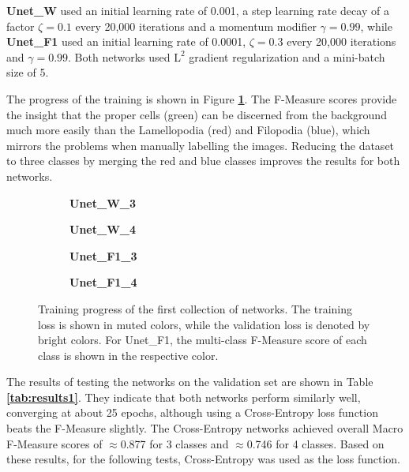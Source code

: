 \textbf{Unet\_W} used an initial learning rate of 0.001, a step learning rate decay of a factor $\zeta = 0.1$ every 20,000 iterations and a momentum modifier $\gamma = 0.99$, while \textbf{Unet\_F1} used an initial learning rate of 0.0001, $\zeta = 0.3$ every 20,000 iterations and $\gamma = 0.99$. Both networks used $\text{L}^2$ gradient regularization and a mini-batch size of 5.

The progress of the training is shown in Figure \textbf{\ref{fig:weighted_f1_training}}. The F-Measure scores provide the insight that the proper cells (green) can be discerned from the background much more easily than the Lamellopodia (red) and Filopodia (blue), which mirrors the problems when manually labelling the images. Reducing the dataset to three classes by merging the red and blue classes improves the results for both networks.\\

\begin {figure}[!ht]
	\begin {subfigure}[b]{0.4\linewidth}
		\scalebox{0.65}{}
		\caption{\textbf{Unet\_W\_3}}
	\end {subfigure}\hspace{1.75cm}
	\begin {subfigure}[b]{0.4\linewidth}
		\scalebox{0.65}{}
		\caption{\textbf{Unet\_W\_4}}
	\end {subfigure}

	\begin {subfigure}[b]{0.4\linewidth}
		\scalebox{0.65}{}
		\caption{\textbf{Unet\_F1\_3}}
	\end {subfigure}\hspace{1.75cm}
	\begin {subfigure}[b]{0.4\linewidth}
		\scalebox{0.65}{}
		\caption{\textbf{Unet\_F1\_4}}
	\end {subfigure}

		\caption[Training progress of the first collection of networks.]{Training progress of the first collection of networks. The training loss is shown in muted colors, while the validation loss is denoted by bright colors. For Unet\_F1, the multi-class F-Measure score of each class is shown in the respective color.}
		\label{fig:weighted_f1_training}
\end {figure}

\noindent The results of testing the networks on the validation set are shown in Table \textbf{\ref{tab:results1}}. They indicate that both networks perform similarly well, converging at about 25 epochs, although using a Cross-Entropy loss function beats the F-Measure slightly. The Cross-Entropy networks achieved overall Macro F-Measure scores of $\approx$0.877 for 3 classes and $\approx$0.746 for 4 classes. Based on these results, for the following tests, Cross-Entropy was used as the loss function.\\ 

